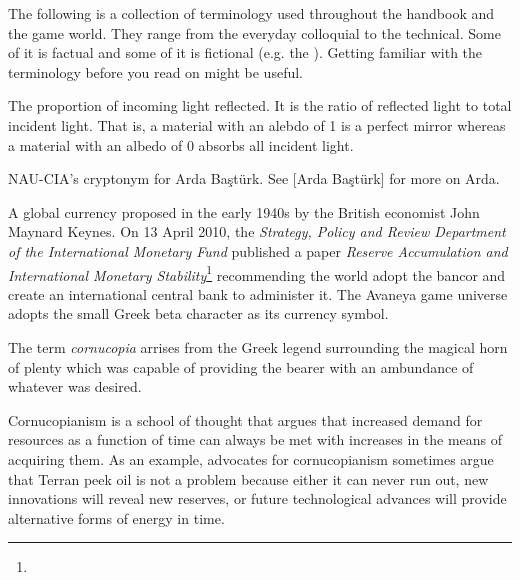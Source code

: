 

The following is a collection of terminology used throughout the handbook and the game world. They range from the everyday colloquial to the technical. Some of it is factual and some of it is fictional (e.g. the {\it \about[Jenya]}). Getting familiar with the terminology before you read on might be useful.

The proportion of incoming light reflected. It is the ratio of reflected light to total incident light. That is, a material with an alebdo of 1 is a perfect mirror whereas a material with an albedo of 0 absorbs all incident light.
\stopdefinition

NAU-CIA's cryptonym for Arda Baştürk. See [Arda Baştürk] for more on Arda.
\stopdefinition

A global currency proposed in the early 1940s by the British economist John Maynard Keynes. On 13 April 2010, the {\it Strategy, Policy and Review Department of the International Monetary Fund} published a paper {\it Reserve Accumulation and International Monetary Stability}\footnote{} recommending the world adopt the bancor and create an international central bank to administer it. The Avaneya game universe adopts the small Greek beta character  as its currency symbol.
\stopdefinition

The term {\it cornucopia} arrises from the Greek legend surrounding the magical horn of plenty which was capable of providing the bearer with an ambundance of whatever was desired.

Cornucopianism is a school of thought that argues that increased demand for resources as a function of time can always be met with increases in the means of acquiring them. As an example, advocates for cornucopianism sometimes argue that Terran peek oil is not a problem because either it can never run out, new innovations will reveal new reserves, or future technological advances will provide alternative forms of energy in time. 

